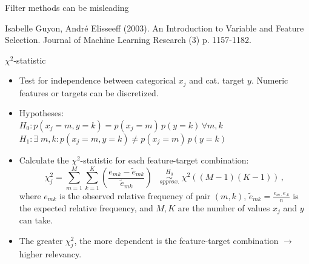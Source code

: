 \documentclass[11pt,compress,t,notes=noshow, xcolor=table]{beamer}
\begin{document}
\begin{vbframe}{Filter methods can be misleading}
   \begin{center}
   \footnotesize{Isabelle Guyon, André Elisseeff (2003). An Introduction to Variable and Feature Selection.  Journal of Machine Learning Research (3) p. 1157-1182.}
   \end{center}

   \end{vbframe}

  \begin{vbframe}{$\chi^2$-statistic}
  \begin{itemize}
    \item Test for independence between categorical $x_j$ and cat. target $y$. Numeric features or targets can be discretized.
    \item Hypotheses: \\
    $H_0: p(x_j = m, y = k) = p(x_j = m)\, p(y = k) \,\forall m, k$\\


    $H_1: \exists \; m, k: p(x_j = m, y = k) \neq p(x_j = m)\, p(y = k)$
    \item Calculate the $\chi^2$-statistic for each feature-target combination:
      $$ \chi_j^2 = \sum_{m = 1}^{M} \sum_{k=1}^{K} (\frac{e_{mk} - \tilde{e}_{mk}}{\tilde{e}_{mk}}) \;\;\;   \stackrel{H_0}{\underset{approx.}{\sim}} \; \chi^2 ((M-1)(K-1))\,,$$
    where $e_{mk}$ is the observed relative frequency of pair $(m,k)$, $\tilde{e}_{mk} = \frac{e_{m \cdot} e_{\cdot k}}{n}$ is the expected relative frequency, and $M,K$ are the number of values $x_j$ and $y$ can take.
    \item The greater $\chi_j^2$, the more dependent is the feature-target combination $\rightarrow$ higher relevancy.
  \end{itemize}
  \end{vbframe}
\end{document}
